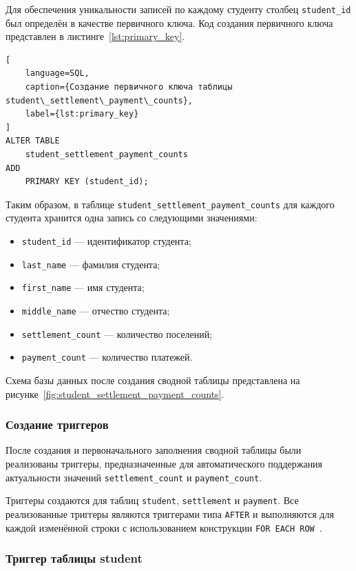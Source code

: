 Для обеспечения уникальности записей по каждому студенту столбец \texttt{student\_id} был определён в качестве первичного ключа. Код создания первичного ключа представлен в листинге~\ref{lst:primary_key}.

\begin{lstlisting}[
    language=SQL,
    caption={Создание первичного ключа таблицы student\_settlement\_payment\_counts},
    label={lst:primary_key}
]
ALTER TABLE
    student_settlement_payment_counts
ADD
    PRIMARY KEY (student_id);
\end{lstlisting}

Таким образом, в таблице \texttt{student\_settlement\_payment\_counts} для каждого студента хранится одна запись со следующими значениями:

\begin{itemize}
    \item \texttt{student\_id} --- идентификатор студента;
    \item \texttt{last\_name} --- фамилия студента;
    \item \texttt{first\_name} --- имя студента;
    \item \texttt{middle\_name} --- отчество студента;
    \item \texttt{settlement\_count} --- количество поселений;
    \item \texttt{payment\_count} --- количество платежей.
\end{itemize}

Схема базы данных после создания сводной таблицы представлена на рисунке~\ref{fig:student_settlement_payment_counts}.

\subsubsection{Создание триггеров}

После создания и первоначального заполнения сводной таблицы были реализованы триггеры, предназначенные для автоматического поддержания актуальности значений \texttt{settlement\_count} и \texttt{payment\_count}.

Триггеры создаются для таблиц \texttt{student}, \texttt{settlement} и \texttt{payment}. Все реализованные триггеры являются триггерами типа \texttt{AFTER} и выполняются для каждой изменённой строки с использованием конструкции \texttt{FOR EACH ROW}~\cite{pg-triggers}.

\subsubsection{Триггер таблицы student}

